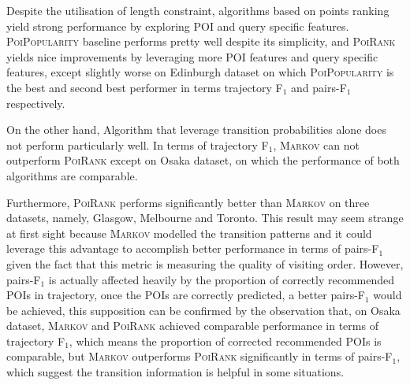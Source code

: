 Despite the utilisation of length constraint, algorithms based on points ranking yield strong performance
by exploring POI and query specific features.
%
\textsc{PoiPopularity} baseline performs pretty well despite its simplicity,
and \textsc{PoiRank} yields nice improvements by leveraging more POI features and query specific features,
except slightly worse on Edinburgh dataset on which \textsc{PoiPopularity} is the best and
second best performer in terms trajectory F$_1$ and pairs-F$_1$ respectively.

On the other hand, Algorithm that leverage transition probabilities alone does not perform particularly well.
%
In terms of trajectory F$_1$,
\textsc{Markov} can not outperform \textsc{PoiRank} except on Osaka dataset,
on which the performance of both algorithms are comparable.

Furthermore, \textsc{PoiRank} performs significantly better than \textsc{Markov} on three datasets, namely,
Glasgow, Melbourne and Toronto.
%
This result may seem strange at first sight because \textsc{Markov} modelled the transition patterns and it could leverage
this advantage to accomplish better performance in terms of pairs-F$_1$ given the fact that this metric is measuring the quality
of visiting order.
However, pairs-F$_1$ is actually affected heavily by the proportion of correctly recommended POIs in trajectory,
once the POIs are correctly predicted, a better pairs-F$_1$ would be achieved,
this supposition can be confirmed by the observation that, on Osaka dataset, \textsc{Markov} and \textsc{PoiRank} achieved
comparable performance in terms of trajectory F$_1$, which means the proportion of corrected recommended POIs is comparable,
but \textsc{Markov} outperforms \textsc{PoiRank} significantly in terms of pairs-F$_1$,
which suggest the transition information is helpful in some situations.

